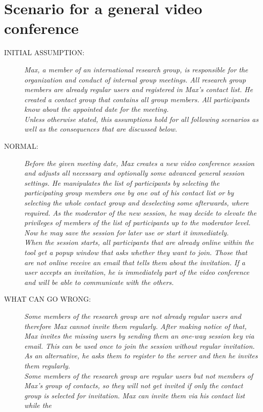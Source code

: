 \section{Scenario for a general video conference}
\begin{description}
\item[INITIAL ASSUMPTION:]
\textit{Max, a member of an international research group, is responsible for
the organization and conduct of internal group meetings. All research group members 
are already regular users and registered in Max's contact list. He created
a contact group that contains all group members. All participants know about
the appointed date for the meeting.
\\Unless otherwise stated, this assumptions
hold for all following scenarios as well as the consequences that are discussed below.}
\item[NORMAL:]
\textit{Before the given meeting date, Max creates
a new video conference session and adjusts all necessary and optionally some advanced general session settings. He
manipulates the list of participants by selecting the participating group
members one by one out of his contact list or by selecting the whole contact
group and deselecting some afterwards, where required. As the moderator of the
new session, he may decide to elevate the privileges of members of the
list of participants up to the moderator level. Now he may save the session for
later use or start it immediately.
\\When the session starts, all participants that are already online within the
tool get a popup window that asks whether they want to join. Those that are not
online receive an email that tells them about the invitation. If a user accepts
an invitation, he is immediately part of the video conference and will be able
to communicate with the others.}
\item[WHAT CAN GO WRONG:]
\textit{Some members of the research group are not already regular users and therefore
Max cannot invite them regularly. After making notice of that, Max invites the
missing users by sending them an one-way session key via email. This can be used
once to join the session without regular invitation. As an
alternative, he asks them to register to the server and then he invites them regularly.
\\Some members of the research group are regular users but not members of Max's
group of contacts, so they will not get invited if only the contact group is
selected for invitation. Max can invite them via his contact list while the
}
\end{description}
